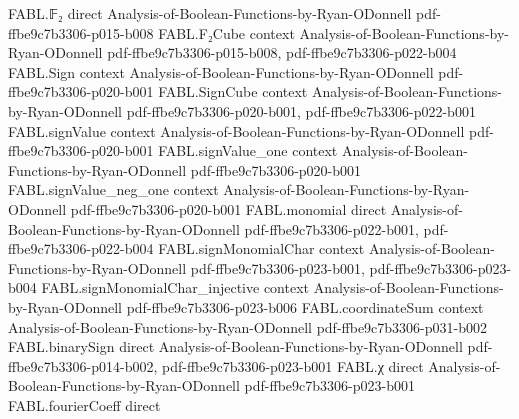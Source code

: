 \begin{theorem}
\label{FABL.FiniteDecisionTree.majorityThree_uniform_averageCost_ge}
\leanok
{}
\proofstep
  {FABL.𝔽₂}
  {direct}
  {Analysis-of-Boolean-Functions-by-Ryan-ODonnell}
  {pdf-ffbe9c7b3306-p015-b008}
\proofstep
  {FABL.F₂Cube}
  {context}
  {Analysis-of-Boolean-Functions-by-Ryan-ODonnell}
  {pdf-ffbe9c7b3306-p015-b008,
    pdf-ffbe9c7b3306-p022-b004}
\proofstep
  {FABL.Sign}
  {context}
  {Analysis-of-Boolean-Functions-by-Ryan-ODonnell}
  {pdf-ffbe9c7b3306-p020-b001}
\proofstep
  {FABL.SignCube}
  {context}
  {Analysis-of-Boolean-Functions-by-Ryan-ODonnell}
  {pdf-ffbe9c7b3306-p020-b001,
    pdf-ffbe9c7b3306-p022-b001}
\proofstep
  {FABL.signValue}
  {context}
  {Analysis-of-Boolean-Functions-by-Ryan-ODonnell}
  {pdf-ffbe9c7b3306-p020-b001}
\proofstep
  {FABL.signValue_one}
  {context}
  {Analysis-of-Boolean-Functions-by-Ryan-ODonnell}
  {pdf-ffbe9c7b3306-p020-b001}
\proofstep
  {FABL.signValue_neg_one}
  {context}
  {Analysis-of-Boolean-Functions-by-Ryan-ODonnell}
  {pdf-ffbe9c7b3306-p020-b001}
\proofstep
  {FABL.monomial}
  {direct}
  {Analysis-of-Boolean-Functions-by-Ryan-ODonnell}
  {pdf-ffbe9c7b3306-p022-b001,
    pdf-ffbe9c7b3306-p022-b004}
\proofstep
  {FABL.signMonomialChar}
  {context}
  {Analysis-of-Boolean-Functions-by-Ryan-ODonnell}
  {pdf-ffbe9c7b3306-p023-b001,
    pdf-ffbe9c7b3306-p023-b004}
\proofstep
  {FABL.signMonomialChar_injective}
  {context}
  {Analysis-of-Boolean-Functions-by-Ryan-ODonnell}
  {pdf-ffbe9c7b3306-p023-b006}
\proofstep
  {FABL.coordinateSum}
  {context}
  {Analysis-of-Boolean-Functions-by-Ryan-ODonnell}
  {pdf-ffbe9c7b3306-p031-b002}
\proofstep
  {FABL.binarySign}
  {direct}
  {Analysis-of-Boolean-Functions-by-Ryan-ODonnell}
  {pdf-ffbe9c7b3306-p014-b002,
    pdf-ffbe9c7b3306-p023-b001}
\proofstep
  {FABL.χ}
  {direct}
  {Analysis-of-Boolean-Functions-by-Ryan-ODonnell}
  {pdf-ffbe9c7b3306-p023-b001}
\proofstep
  {FABL.fourierCoeff}
  {direct}

\end{theorem}

